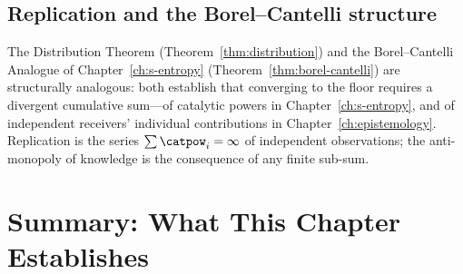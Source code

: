 \subsection*{Replication and the Borel--Cantelli structure}
The Distribution Theorem (Theorem~\ref{thm:distribution}) and the Borel--Cantelli Analogue of Chapter~\ref{ch:s-entropy} (Theorem~\ref{thm:borel-cantelli}) are structurally analogous: both establish that converging to the floor requires a divergent cumulative sum---of catalytic powers in Chapter~\ref{ch:s-entropy}, and of independent receivers' individual contributions in Chapter~\ref{ch:epistemology}. Replication is the series $\sum \catpow_i = \infty$ of independent observations; the anti-monopoly of knowledge is the consequence of any finite sub-sum.


\section{Summary: What This Chapter Establishes}
\label{sec:ch2-summary}

